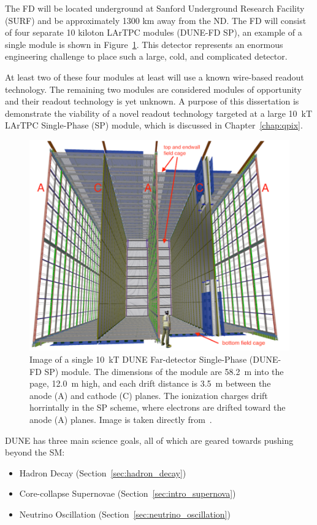 The FD will be located underground at Sanford Underground Research Facility (SURF) and be approximately 1300 km away from the ND.
The FD will consist of four separate 10 kiloton LArTPC modules (DUNE-FD SP), an example of a single module is shown in Figure~\ref{fig:dune_10kt}.
This detector represents an enormous engineering challenge to place such a large, cold, and complicated detector.

At least two of these four modules at least will use a known wire-based readout technology.
The remaining two modules are considered modules of opportunity and their readout technology is yet unknown.
A purpose of this dissertation is demonstrate the viability of a novel readout technology targeted at a large 10~\unit{kT} LArTPC Single-Phase (SP) module, which is discussed in Chapter~\ref{chap:qpix}.

\begin{figure}[]
\centering
\includegraphics[width=\textwidth]{images/dune_fd_10ktmodule_tdrv1.png}
\caption{Image of a single 10~\unit{kT} DUNE Far-detector Single-Phase (DUNE-FD SP) module.
The dimensions of the module are 58.2~\unit{m} into the page, 12.0~\unit{m} high, and each drift distance is 3.5~\unit{m} between the anode (A) and cathode (C) planes. 
The ionization charges drift horrintally in the SP scheme, where electrons are drifted toward the anode (A) planes.
Image is taken directly from~\citep{DUNE_TDR_V1_Abi_2020}.
}
\label{fig:dune_10kt}
\end{figure}


DUNE has three main science goals, all of which are geared towards pushing beyond the SM:
\begin{itemize}
    \item Hadron Decay (Section~\ref{sec:hadron_decay})
    \item Core-collapse Supernovae (Section~\ref{sec:intro_supernova})
    \item Neutrino Oscillation (Section~\ref{sec:neutrino_oscillation})
\label{item:dune_props}
\end{itemize}

